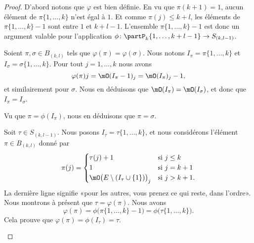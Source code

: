 \begin{proof}
	D'abord notons que \( \varphi\) est bien définie. En vu que \( \pi(k+1)=1\), aucun élément de \( \pi\{ 1,\ldots,k \}\) n'est égal à \( 1\). Et comme \( \pi(j)\leq k+l\), les éléments de \( \pi\{ 1,\ldots,k \}-1\) sont entre \( 1\) et \( k+l-1\). L'ensemble \( \pi\{ 1,\ldots,k \}-1\) est donc un argument valable pour l'application \(\phi \colon \partP_k\{ 1,\ldots,k+l-1 \}\to S_{(k,l-1)}  \).

	\begin{subproof}
		Soient \( \pi,\sigma\in B_{(k,l)}\) tels que \( \varphi(\pi)=\varphi(\sigma)\). Nous notons \( I_{\pi}=\pi\{ 1,\ldots,k \}\) et \( I_{\sigma}=\sigma\{ 1,\ldots,k \}\). Pour tout \( j=1,\ldots,k\) nous avons
		\begin{equation}
			\varphi(\pi)j=\mO(I_{\pi}-1)_j=\mO(I_{\pi})_j-1,
		\end{equation}
		et similairement pour \( \sigma\). Nous en déduisons que \( \mO(I_{\pi})=\mO(I_{\sigma})\), et donc que \( I_{\pi}=I_{\sigma}\).

		Vu que \( \pi=\phi(I_{\pi})\), nous en déduisons que \( \pi=\sigma\).

		\spitem[Surjectif]
		Soit \( \tau\in S_{(k,l-1)}\). Nous posons \( I_{\tau}=\tau\{ 1,\ldots,k \}\), et nous considérons l'élément \( \pi\in B_{(k,l)}\) donné par
		\begin{equation}
			\pi(j)=\begin{cases}
				\tau(j)+1                                         & \text{si } j\leq k \\
				1                                                 & \text{si } j=k+1   \\
				\mO\big( E\setminus (I_{\tau}\cup\{ 1 \}) \big)_j & \text{si } j>k+1.
			\end{cases}
		\end{equation}
		La dernière ligne signifie «pour les autres, vous prenez ce qui reste, dans l'ordre». Nous montrons à présent que \( \tau=\varphi(\pi)\). Nous avons
		\begin{equation}
			\varphi(\pi)=\phi\big( \pi\{ 1,\ldots,k \}-1 \big)=\phi\big( \tau\{ 1,\ldots,k \} \big).
		\end{equation}
		Cela prouve que \( \varphi(\pi)=\phi(I_{\tau})=\tau\).
	\end{subproof}


\end{proof}

